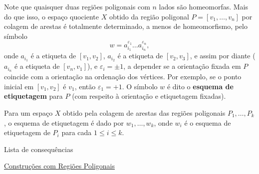 Note que quaisquer duas regiões poligonais com $n$ lados são homeomorfas. Mais do que isso, o espaço quociente $X$ obtido da região poligonal $P = [v_1,\ldots,v_n]$ por colagem de arestas é totalmente determinado, a menos de homeomorfismo, pelo símbolo
\[w = a_{i_1}^{\varepsilon_1} \ldots a_{i_n}^{\varepsilon_n},\]
onde $a_{i_1}$ é a etiqueta de $[v_1, v_2]$, $a_{i_2}$ é a etiqueta de $[v_2, v_3]$, e assim por diante ($a_{i_n}$ é a etiqueta de $[v_n, v_1]$), e $\varepsilon_i = \pm 1$, a depender se a orientação fixada em $P$ coincide com a orientação na ordenação dos vértices. Por exemplo, se o ponto inicial em $[v_1, v_2]$ é $v_1$, então $\varepsilon_1 = +1$. O símbolo $w$ é dito o \textbf{esquema de etiquetagem} para $P$ (com respeito à orientação e etiquetagem fixadas).

Para um espaço $X$ obtido pela colagem de arestas das regiões poligonais $P_1,\ldots, P_k$, o esquema de etiquetagem é dado por $w_1,\ldots, w_k$, onde $w_i$ é o esquema de etiquetagem de $P_i$ para cada $1\leq i \leq k$.

\begin{titlemize}{Lista de consequências}
    \item \hyperref[construcoes-regiao-poligonal-prop]{Construções com Regiões Poligonais}%
\end{titlemize}